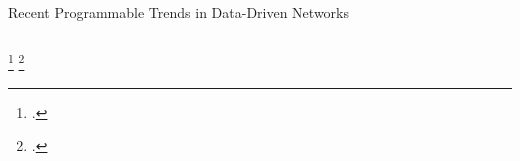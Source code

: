 \documentclass[aspectratio=169,xcolor={dvipsnames}
]{beamer}
\begin{document}
\begin{frame}{Recent Programmable Trends in Data-Driven Networks}
\begin{columns}
\begin{column}{0.4\linewidth}
		\end{column}
	\end{columns}
\setcounter{footnote}{1}
\footcitetext{DBLP:journals/corr/abs-2009-02353}
\setcounter{footnote}{2}
\footcitetext{DBLP:conf/hotnets/XiongZ19}
\end{frame}
\end{document}
